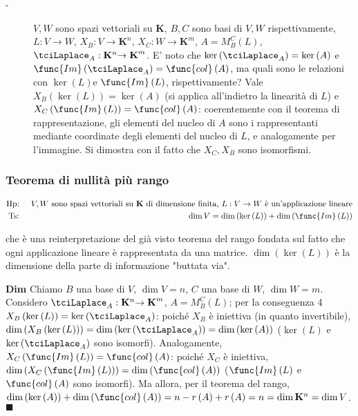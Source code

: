 \documentclass{article}
\begin{document}
\begin{description}
\item[-] $V,W$ sono spazi vettoriali su $\mathbf{K}$, $B,C$ sono basi di $%
V,W $ rispettivamente, $L:V\rightarrow W$, $X_{B}:V\rightarrow \mathbf{K}%
^{n} $, $X_{C}:W\rightarrow \mathbf{K}^{m}$, $A=M_{B}^{C}\left( L\right) $, $%
\tciLaplace _{A}:\mathbf{K}^{n}\mathbf{\rightarrow K}^{m}$. E' noto che $%
\ker \left( \tciLaplace _{A}\right) =\ker \left( A\right) $ e $\func{Im}%
\left( \tciLaplace _{A}\right) =\func{col}\left( A\right) $, ma quali sono
le relazioni con $\ker \left( L\right) $e $\func{Im}\left( L\right) $,
rispettivamente? Vale $X_{B}\left( \ker \left( L\right) \right) =\ker \left(
A\right) $ (si applica all'indietro la linearit\`{a} di $L$) e $X_{C}\left( 
\func{Im}\left( L\right) \right) =\func{col}\left( A\right) $: coerentemente
con il teorema di rappresentazione, gli elementi del nucleo di $A$ sono i
rappresentanti mediante coordinate degli elementi del nucleo di $L$, e
analogamente per l'immagine. Si dimostra con il fatto che $X_{C},X_{B}$ sono
isomorfismi.
\end{description}

\subsubsection{Teorema di nullit\`{a} pi\`{u} rango}

\begin{eqnarray*}
\text{Hp}\text{: } &&V,W\text{ sono spazi vettoriali su }\mathbf{K}\text{ di
dimensione finita, }L:V\rightarrow W\text{ \`{e} un'applicazione lineare} \\
\text{Ts}\text{: } &&\dim V=\dim \left( \ker \left( L\right) \right) +\dim
\left( \func{Im}\left( L\right) \right)
\end{eqnarray*}

che \`{e} una reinterpretazione del gi\`{a} visto teorema del rango fondata
sul fatto che ogni applicazione lineare \`{e} rappresentata da una matrice. $%
\dim \left( \ker \left( L\right) \right) $ \`{e} la dimensione della parte
di informazione "buttata via".

\textbf{Dim} Chiamo $B$ una base di $V$, $\dim V=n$, $C$ una base di $W$, $%
\dim W=m$. Considero $\tciLaplace _{A}:\mathbf{K}^{n}\mathbf{\rightarrow K}%
^{m}$, $A=M_{B}^{C}\left( L\right) $; per la conseguenza 4 $X_{B}\left( \ker
\left( L\right) \right) =\ker \left( \tciLaplace _{A}\right) $: poich\'{e} $%
X_{B}$ \`{e} iniettiva (in quanto invertibile), $\dim \left( X_{B}\left(
\ker \left( L\right) \right) \right) =\dim \left( \ker \left( \tciLaplace
_{A}\right) \right) =\dim \left( \ker \left( A\right) \right) $ ($\ker
\left( L\right) $ e $\ker \left( \tciLaplace _{A}\right) $ sono isomorfi).
Analogamente, $X_{C}\left( \func{Im}\left( L\right) \right) =\func{col}%
\left( A\right) $: poich\'{e} $X_{C}$ \`{e} iniettiva, $\dim \left(
X_{C}\left( \func{Im}\left( L\right) \right) \right) =\dim \left( \func{col}%
\left( A\right) \right) $ ($\func{Im}\left( L\right) $ e $\func{col}\left(
A\right) $ sono isomorfi). Ma allora, per il teorema del rango, $\dim \left(
\ker \left( A\right) \right) +\dim \left( \func{col}\left( A\right) \right)
=n-r\left( A\right) +r\left( A\right) =n=\dim \mathbf{K}^{n}=\dim V$. $%
\blacksquare $
\end{document}
